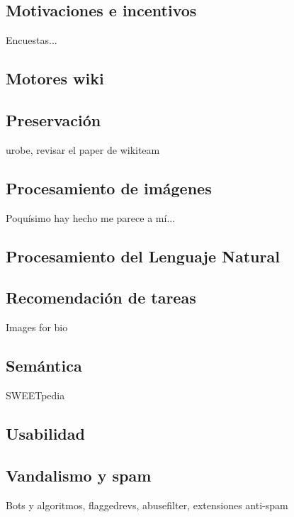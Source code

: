 \documentclass[11pt,onecolumn]{article}
\begin{document}
\subsection{Motivaciones e incentivos}


Encuestas...

\subsection{Motores wiki}


\subsection{Preservación}

urobe, revisar el paper de wikiteam

\subsection{Procesamiento de imágenes}

Poquísimo hay hecho me parece a mí...

\subsection{Procesamiento del Lenguaje Natural}


\subsection{Recomendación de tareas}

Images for bio

\subsection{Semántica}

SWEETpedia

\subsection{Usabilidad}

\subsection{Vandalismo y spam}

Bots y algoritmos, flaggedrevs, abusefilter, extensiones anti-spam

~\citep{avbot2011}
~\citep{avbot2010}
~\citep{avbot2009}
\end{document}
